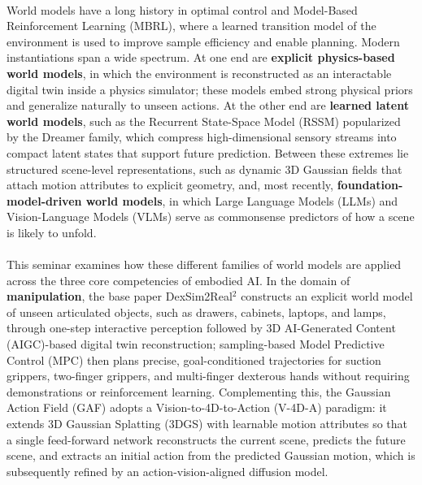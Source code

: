 \documentclass[12pt,a4paper,final]{extreport}
\begin{document}
\paragraph{} World models have a long history in optimal control and Model-Based Reinforcement Learning (MBRL), where a learned transition model of the environment is used to improve sample efficiency and enable planning. Modern instantiations span a wide spectrum. At one end are \textbf{explicit physics-based world models}, in which the environment is reconstructed as an interactable digital twin inside a physics simulator; these models embed strong physical priors and generalize naturally to unseen actions. At the other end are \textbf{learned latent world models}, such as the Recurrent State-Space Model (RSSM) popularized by the Dreamer family, which compress high-dimensional sensory streams into compact latent states that support future prediction. Between these extremes lie structured scene-level representations, such as dynamic 3D Gaussian fields that attach motion attributes to explicit geometry, and, most recently, \textbf{foundation-model-driven world models}, in which Large Language Models (LLMs) and Vision-Language Models (VLMs) serve as commonsense predictors of how a scene is likely to unfold.

\paragraph{} This seminar examines how these different families of world models are applied across the three core competencies of embodied AI. In the domain of \textbf{manipulation}, the base paper DexSim2Real$^2$ \cite{p1} constructs an explicit world model of unseen articulated objects, such as drawers, cabinets, laptops, and lamps, through one-step interactive perception followed by 3D AI-Generated Content (AIGC)-based digital twin reconstruction; sampling-based Model Predictive Control (MPC) then plans precise, goal-conditioned trajectories for suction grippers, two-finger grippers, and multi-finger dexterous hands without requiring demonstrations or reinforcement learning. Complementing this, the Gaussian Action Field (GAF) \cite{p2} adopts a Vision-to-4D-to-Action (V-4D-A) paradigm: it extends 3D Gaussian Splatting (3DGS) with learnable motion attributes so that a single feed-forward network reconstructs the current scene, predicts the future scene, and extracts an initial action from the predicted Gaussian motion, which is subsequently refined by an action-vision-aligned diffusion model.
\end{document}
